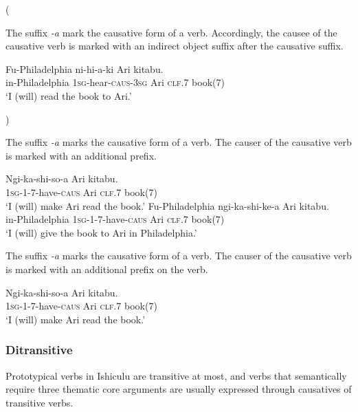 (


The suffix \textit{-\textbeltl a} mark the causative form of a verb. Accordingly, the causee of the causative verb is marked with an indirect object suffix after the causative suffix.

\begin{exe}
\ex
\gll Fu-Philadelphia ni-hi-\textipa{\textbeltl}a-ki Ari  kitabu. \\
in-Philadelphia \textsc{1sg}-hear-\textsc{caus}-\textsc{3sg} Ari \textsc{clf}.7 book(7) \\
\trans `I (will) read the book to Ari.'
\end{exe}

)


The suffix \textit{-\textbeltl a} marks the causative form of a verb. The causer of the causative verb is marked with an additional prefix.

\begin{exe}
\ex
\gll Ngi-ka-shi-so-\textipa{\textbeltl}a Ari  kitabu. \\
\textsc{1sg}-\textsc{1}-\textsc{7}-have-\textsc{caus} Ari \textsc{clf}.7 book(7) \\
\trans `I (will) make Ari read the book.'
\ex
\gll Fu-Philadelphia ngi-ka-shi-ke-\textipa{\textbeltl}a Ari  kitabu. \\
in-Philadelphia \textsc{1sg}-\textsc{1}-\textsc{7}-have-\textsc{caus} Ari \textsc{clf}.7 book(7) \\
\trans `I (will) give the book to Ari in Philadelphia.'
\end{exe}


The suffix \textit{-\textbeltl a} marks the causative form of a verb. The causer of the causative verb is marked with an additional prefix on the verb.

\begin{exe}
\ex
\gll Ngi-ka-shi-so-\textipa{\textbeltl}a Ari  kitabu. \\
\textsc{1sg}-\textsc{1}-\textsc{7}-have-\textsc{caus} Ari \textsc{clf}.7 book(7) \\
\trans `I (will) make Ari read the book.'
\end{exe}

\subsubsection{Ditransitive}

Prototypical verbs in Ishiculu are transitive at most, and verbs that semantically require three thematic core arguments are usually expressed through causatives of transitive verbs.

